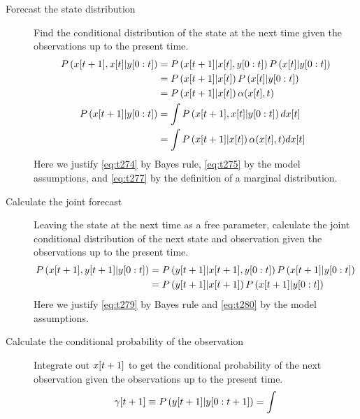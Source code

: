 \begin{description}
\item[Forecast the state distribution]  Find the
  conditional distribution of the state at the next time given the
  observations up to the present time.
\begin{align}
  \label{eq:t274}
  P\left({x}{[t+1]},{x}{[t]}|y[0:t] \right) &=
  P\left({x}{[t+1]}|{x}{[t]},y[0:t] \right)
  P\left({x}{[t]}|y[0:t] \right) \\
  \label{eq:t275}
  &= P\left({x}{[t+1]}|{x}{[t]} \right)
  P\left({x}{[t]}|y[0:t] \right) \\
  &= P\left({x}{[t+1]}|{x}{[t]} \right)
  \alpha({x}{[t]},t)\\
  \label{eq:t277}
  P\left({x}{[t+1]}|y[0:t] \right) &= \int
  P\left({x}{[t+1]},{x}{[t]}|y[0:t] \right) d{x}{[t]}\\
  \label{eq:IFore}
  &= \int P \left({x}{[t+1]}|{x}{[t]} \right)
  \alpha({x}{[t]},t) d{x}{[t]}
\end{align}
Here we justify \eqref{eq:t274} by Bayes rule, \eqref{eq:t275} by
the model assumptions, and \eqref{eq:t277} by the definition of a
marginal distribution.
\item[Calculate the joint forecast] Leaving the state at the next time
  as a free parameter, calculate the joint conditional distribution of
  the next state and observation given the observations up to the
  present time.
\begin{align}
  \label{eq:t279}
  P\left({x}{[t+1]},{y}{[t+1]}|y[0:t] \right) &=
  P\left({y}{[t+1]}|{x}{[t+1]},y[0:t] \right)
  P\left({x}{[t+1]}|y[0:t] \right) \\
  \label{eq:t280}
  &=P\left({y}{[t+1]}|{x}{[t+1]} \right)
  P\left({x}{[t+1]}|y[0:t] \right)
\end{align}
Here we justify \eqref{eq:t279} by Bayes rule and \eqref{eq:t280} by
the model assumptions.
\item[Calculate the conditional probability of the observation]
  Integrate out ${x}{[t+1]}$ to get the conditional probability of
  the next observation given the observations up to the present time.
\begin{equation}
  \label{eq:Igamma}
  \ti{\gamma}{t+1} \equiv P\left(\ti{y}{t+1}|\ts{y}{0}{t+1} \right) = \int

\end{equation}
\end{description}
